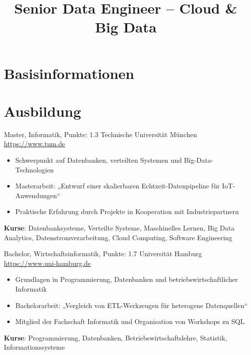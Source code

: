 \documentclass[a4paper, serif, 10pt]{moderncv}
\title{Senior Data Engineer – Cloud \& Big Data}
\begin{document}
\maketitle

\section{Basisinformationen}

\section{Ausbildung}

        {Master, Informatik, Punkte: 1.3}
        {Technische Universität München}
        {\url{https://www.tum.de}}
        {}
        {\begin{itemize}
\item Schwerpunkt auf Datenbanken, verteilten Systemen und Big-Data-Technologien
\item Masterarbeit: „Entwurf einer skalierbaren Echtzeit-Datenpipeline für IoT-Anwendungen“
\item Praktische Erfahrung durch Projekte in Kooperation mit Industriepartnern
\end{itemize}
\textbf{Kurse}: Datenbanksysteme, Verteilte Systeme, Maschinelles Lernen, Big Data Analytics, Datenstromverarbeitung, Cloud Computing, Software Engineering}

        {Bachelor, Wirtschaftsinformatik, Punkte: 1.7}
        {Universität Hamburg}
        {\url{https://www.uni-hamburg.de}}
        {}
        {\begin{itemize}
\item Grundlagen in Programmierung, Datenbanken und betriebswirtschaftlicher Informatik
\item Bachelorarbeit: „Vergleich von ETL-Werkzeugen für heterogene Datenquellen“
\item Mitglied der Fachschaft Informatik und Organisation von Workshops zu SQL
\end{itemize}
\textbf{Kurse}: Programmierung, Datenbanken, Betriebswirtschaftslehre, Statistik, Informationssysteme}
\end{document}

